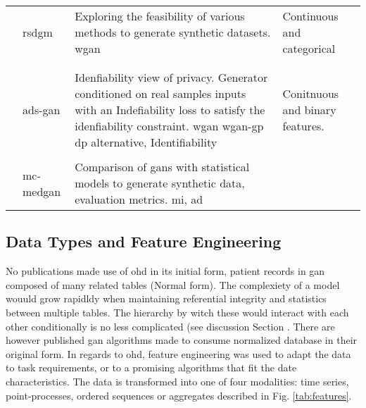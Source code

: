 \begin{sidewaystable}[htbp]
\begin{tabularx}{\textwidth}{@{}p{4cm}XXX@{}}
            \cite{ozyigit2020generation}
            & \gls{rsdgm}
            & Exploring the feasibility of various methods to generate synthetic datasets. \gls{wgan}
            & Continuous and categorical\\
            
            
            
            \cite{Rankin2020}
            & 
            & 
            &\\
            
            \cite{Zhang2020}
            & 
            & 
            &\\
            
            \cite{Yoon2020-anon}
            & \gls{ads-gan}
            & Idenfiability view of privacy. Generator conditioned on real samples inputs with an Indefiability loss to satisfy the idenfiability constraint. \gls{wgan} \gls{wgan-gp} \gls{dp} alternative, Identifiability
            & Conitnuous and binary features.\\
            
            \cite{BaeAnomiGAN2020}
            & 
            & 
            &\\
            
            \cite{Goncalves2020}
            & \gls{mc-medgan}
            & Comparison of \glspl{gan} with statistical models to generate synthetic data, evaluation metrics. \gls{mi}, \gls{ad}
            &\\
            
            
            
            
            \bottomrule
        \end{tabularx}
    \end{sidewaystable}

    \subsection{Data Types and Feature Engineering}

    No publications made use of \gls{ohd} in its initial form, patient records in \gls{gan} composed of many related tables (Normal form). The complexiety of a model wouuld grow rapidldy when maintaining referential integrity and statistics between multiple tables. The hierarchy by witch these would interact with each other conditionally is no less complicated (see discussion Section . There are however published \gls{gan} algorithms made to consume normalized database in their original form. \todo In regards to \gls{ohd}, feature engineering was used to adapt the data to task requirements, or to a promising algorithms that fit the date characteristics. The data is transformed into one of four modalities: time series, point-processes, ordered sequences or aggregates described in Fig. \ref{tab:features}.
    
